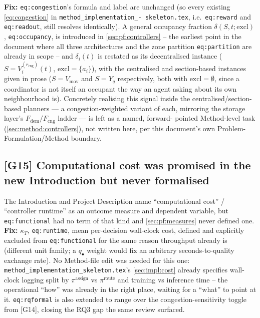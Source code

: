 \documentclass[11pt]{article}
\begin{document}
\textbf{Fix:} \texttt{eq:congestion}'s formula and label are unchanged (so
every existing \eqref{eq:congestion} in \texttt{method\_implementation\_-
skeleton.tex}, i.e.\ \texttt{eq:reward} and \texttt{eq:readout}, still resolves
identically). A general occupancy fraction $\delta(S,t;\mathrm{excl})$,
\texttt{eq:occupancy}, is introduced in \ref{sec:pf:controllers} -- the
earliest point in the document where all three architectures and the zone
partition \texttt{eq:partition} are already in scope -- and $\delta_i(t)$ is
restated as its decentralised instance ($S=V^{(r_{\mathrm{cng}})}_i(t)$,
$\mathrm{excl}=\{a_i\}$), with the centralised and section-based instances
given in prose ($S=V_{\mathrm{mov}}$ and $S=Y_q$ respectively, both with
$\mathrm{excl}=\emptyset$, since a coordinator is not itself an occupant the
way an agent asking about its own neighbourhood is). Concretely realising
this signal inside the centralised/section-based planners --- a
congestion-weighted variant of each, mirroring the storage layer's
$F_{\mathrm{dem}}/F_{\mathrm{cng}}$ ladder --- is left as a named, forward-
pointed Method-level task (\ref{sec:method:controllers}), not written here,
per this document's own Problem-Formulation/Method boundary.

\subsection{[G15] Computational cost was promised in the new Introduction but never formalised}
The Introduction and Project Description name ``computational cost'' /
``controller runtime'' as an outcome measure and dependent variable, but
\texttt{eq:functional} had no term of that kind and \ref{sec:pf:measures}
never defined one. \textbf{Fix:} $\kappa_T$, \texttt{eq:runtime}, mean
per-decision wall-clock cost, defined and explicitly excluded from
\texttt{eq:functional} for the same reason throughput already is (different
unit family; a $q_\bullet$ weight would fix an arbitrary seconds-to-quality
exchange rate). No Method-file edit was needed for this one:
\texttt{method\_implementation\_skeleton.tex}'s \ref{sec:impl:cost} already
specifies wall-clock logging split by $\pi^{\mathrm{assign}}$ vs
$\pi^{\mathrm{route}}$ and training vs inference time -- the operational
``how'' was already in the right place, waiting for a ``what'' to point at it.
\texttt{eq:rqformal} is also extended to range over the congestion-sensitivity
toggle from [G14], closing the RQ3 gap the same review surfaced.
\end{document}
